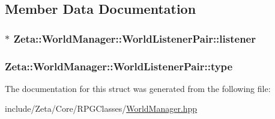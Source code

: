 \subsection{Member Data Documentation}
\hypertarget{structZeta_1_1WorldManager_1_1WorldListenerPair_af0885d194c09e4172f832139a913cf6b}{
\subsubsection[{listener}]{$\ast$ Zeta\+::\+World\+Manager\+::\+World\+Listener\+Pair\+::listener}}\label{structZeta_1_1WorldManager_1_1WorldListenerPair_af0885d194c09e4172f832139a913cf6b}
\hypertarget{structZeta_1_1WorldManager_1_1WorldListenerPair_ac3037b18f604f6a3e63426e88254352b}{
\subsubsection[{type}]{ Zeta\+::\+World\+Manager\+::\+World\+Listener\+Pair\+::type}}\label{structZeta_1_1WorldManager_1_1WorldListenerPair_ac3037b18f604f6a3e63426e88254352b}


The documentation for this struct was generated from the following file\+:\begin{DoxyCompactItemize}
\item 
include/\+Zeta/\+Core/\+R\+P\+G\+Classes/\hyperlink{WorldManager_8hpp}{World\+Manager.\+hpp}\end{DoxyCompactItemize}
